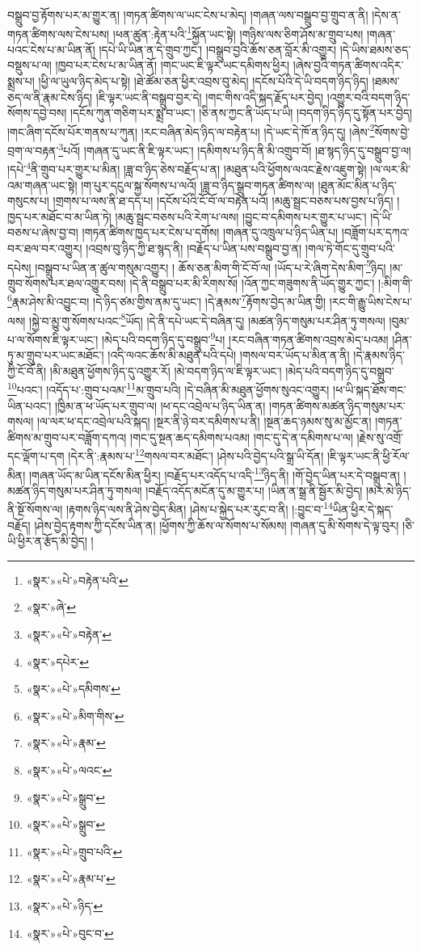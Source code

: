 བསྒྲུབ་བྱ་རྟོགས་པར་མ་གྱུར་ན། །གཏན་ཚིགས་ལ་ཡང་ངེས་པ་མེད། །གཞན་ལས་བསྒྲུབ་བྱ་གྲུབ་ན་ནི། །དེས་ན་གཏན་ཚིགས་ལས་ངེས་པས། །ཕན་ཚུན་:རྟེན་པའི་\footnote{«སྣར་»«པེ་»བརྟེན་པའི་}སྐྱོན་ཡང་སྟེ། །གཉིས་ལས་ཅིག་ཤོས་མ་གྲུབ་པས། །གཞན་པའང་ངེས་པ་མ་ཡིན་ནོ། །དཔེ་ཡི་ཡིན་ན་དེ་གྲུབ་ཀྱང་། །བསྒྲུབ་བྱའི་ཆོས་ཅན་བློར་མི་འགྱུར། །དེ་ཡིས་ཐམས་ཅད་བསྡུས་པ་ལ། །ཁྱབ་པར་ངེས་པ་མ་ཡིན་ནོ། །གང་ཡང་ཇི་ལྟར་ཡང་དམིགས་ཕྱིར། །ཞེས་བྱའི་གཏན་ཚིགས་འདིར་སྨྲས་པ། །ཕྱི་ལ་ཡུལ་ཉིད་མེད་པ་སྟེ། །ཐེ་ཚོམ་ཅན་ཕྱིར་འབྲས་བུ་མེད། །དངོས་པོའི་དེ་ཡི་བདག་ཉིད་ཉིད། །ཐམས་ཅད་ལ་ནི་རྣམ་ངེས་ཉིད། །ཇི་ལྟར་ཡང་ནི་བསྒྲུབ་བྱར་དེ། །གང་གིས་འདི་སྐད་རྗོད་པར་བྱེད། །འགྱུར་བའི་བདག་ཉིད་སོགས་དབྱེ་བས། །དངོས་ཀུན་གཅིག་པར་སྨྲ་བ་ཡང་། །ཅི་ནས་ཀྱང་ནི་ཡོད་པ་ཡི། །བདག་ཉིད་ཉིད་དུ་སྟོན་པར་བྱེད། །གང་ཞིག་དངོས་པོར་གནས་པ་ཀུན། །རང་བཞིན་མེད་ཉིད་ལ་བརྟེན་པ། །དེ་ཡང་དེ་ཁོ་ན་ཉིད་དུ། །ཞེས་\footnote{«སྣར་»ཞེ་}སོགས་བྱེ་བྲག་ལ་བརྟན་\footnote{«སྣར་»«པེ་»བརྟེན་}པའོ། །གཞན་དུ་ཡང་ནི་ཇི་ལྟར་ཡང་། །དམིགས་པ་ཉིད་ནི་མི་འགྲུབ་བོ། །ཐ་སྙད་ཉིད་དུ་བསྒྲུབ་བྱ་ལ། །དཔེ་\footnote{«སྣར་»དཔེར་}ནི་གྲུབ་པར་གྱུར་པ་མིན། །ཟླ་བ་ཉིད་ཅེས་བརྗོད་པ་ན། །མཐུན་པའི་ཕྱོགས་ལའང་རྗེས་འཇུག་སྟེ། །ལ་ལར་མི་འམ་གཞན་ཡང་སྟེ། །ག་པུར་དངུལ་སྐྱ་སོགས་པ་ལའོ། །ཟླ་བ་ཉིད་སྒྲུབ་གཏན་ཚིགས་ལ། །ཐུན་མོང་མིན་པ་ཉིད་གསུངས་པ། །གྲགས་པ་ལས་ནི་ཐ་དད་པ། །དངོས་པོའི་ངོ་བོ་ལ་བརྟེན་པའོ། །མཆུ་སྦྲང་བཅས་པས་བྱས་པ་ཉིད། །ཁྱད་པར་མཐོང་བ་མ་ཡིན་ཏེ། །མཆུ་སྦྲང་བཅས་པའི་རེག་པ་ལས། །བྱུང་བ་དམིགས་པར་གྱུར་པ་ཡང་། །དེ་ཡི་བཅས་པ་ཞེས་བྱ་བ། །གཏན་ཚིགས་ཁྱད་པར་ངེས་པ་དགོས། །གཞན་དུ་འཁྲུལ་པ་ཉིད་ཡིན་པ། །བཟློག་པར་དཀའ་བར་ཐལ་བར་འགྱུར། །འབྲས་བུ་ཉིད་ཀྱི་ཐ་སྙད་ནི། །བརྗོད་པ་ཡིན་པས་བསྒྲུབ་བྱ་ན། །གལ་ཏེ་གོང་དུ་གྲུབ་པའི་དཔེས། །བསྒྲུབ་པ་ཡིན་ན་ཚུལ་གསུམ་འགྱུར། །
ཆོས་ཅན་མིག་གི་ངོ་བོ་ལ། །ཡོད་པ་རེ་ཞིག་དེས་མིག་\footnote{«སྣར་»«པེ་»དམིགས་}ཉིད། །མ་གྲུབ་སོགས་པར་ཐལ་འགྱུར་བས། །དེ་ནི་བསྒྲུབ་པར་མི་རིགས་སོ། །འོན་ཀྱང་གཟུགས་ནི་ཡོད་གྱུར་ཀྱང་། །:མིག་གི་\footnote{«སྣར་»«པེ་»མིག་གིས་}རྣམ་ཤེས་མི་འབྱུང་བ། །དེ་ཉིད་ཙམ་གྱིས་ནམ་དུ་ཡང་། །དེ་རྣམས་\footnote{«སྣར་»«པེ་»རྣམ་}རྟོགས་བྱེད་མ་ཡིན་གྱི། །རང་གི་རྒྱུ་ཡིས་ངེས་པ་ལས། །སྐྱེ་བ་མྱུ་གུ་སོགས་པའང་\footnote{«སྣར་»«པེ་»ལའང་}ཡོད། །དེ་ནི་དཔེ་ཡང་དེ་བཞིན་དུ། །མཚན་ཉིད་གསུམ་པར་ཤིན་ཏུ་གསལ། །བུམ་པ་ལ་སོགས་ཇི་ལྟར་ཡང་། །མེད་པའི་བདག་ཉིད་དུ་བསྒྲུབ་\footnote{«སྣར་»«པེ་»སྒྲུབ་}པ། །རང་བཞིན་གཏན་ཚིགས་འབྲས་མེད་པའམ། །ཤིན་ཏུ་མ་གྲུབ་པར་ཡང་མཐོང་། །འདི་ལའང་ཆོས་མི་མཐུན་པའི་དཔེ། །གསལ་བར་ཡོད་པ་མིན་ན་ནི། །དེ་རྣམས་ཉིད་ཀྱི་ངོ་བོ་ནི། །མི་མཐུན་ཕྱོགས་ཉིད་དུ་འགྱུར་རོ། །མེ་བདག་ཉིད་ལ་ཇི་ལྟར་ཡང་། །མེད་པའི་བདག་ཉིད་དུ་བསྒྲུབ་\footnote{«སྣར་»«པེ་»སྒྲུབ་}པའང་། །འདོད་པ་:གྲུབ་པའམ་\footnote{«སྣར་»«པེ་»གྲུབ་པའི་}མ་གྲུབ་པའི། །དེ་བཞིན་མི་མཐུན་ཕྱོགས་སུའང་འགྱུར། །ཕ་ཡི་སྐད་ཐོས་གང་ཡིན་པའང་། །ཁྱིམ་ན་ཕ་ཡོད་པར་གྲུབ་ལ། །ཕ་དང་འབྲེལ་པ་ཉིད་ཡིན་ན། །གཏན་ཚིགས་མཚན་ཉིད་གསུམ་པར་གསལ། །ལ་ལར་ཕ་དང་འབྲེལ་པའི་སྐད། །སྔར་ནི་ཉེ་བར་དམིགས་པ་ནི། །སྔན་ཆད་ཉམས་སུ་མ་མྱོང་ན། །གཏན་ཚིགས་མ་གྲུབ་པར་བཟློག་དཀའ། །གང་དུ་སྔན་ཆད་དམིགས་པའམ། །གང་དུ་དེ་ན་དམིགས་པ་ལ། །རྗེས་སུ་འགྲོ་དང་ལྡོག་པ་དག །དེར་ནི་:རྣམས་པ་\footnote{«སྣར་»«པེ་»རྣམ་པ་}གསལ་བར་མཐོང་། །ཤེས་པའི་བྱེད་པའི་སྒྲ་ཡི་དོན། །ཇི་ལྟར་ཡང་ནི་ཕྱི་རོལ་མིན། །གཞན་ཡོད་མ་ཡིན་དངོས་མིན་ཕྱིར། །བརྗོད་པར་འདོད་པ་འདི་\footnote{«སྣར་»«པེ་»ཉིད་}ཉིད་ནི། །གོ་བྱེད་ཡིན་པར་དེ་བསྒྲུབ་ན། །མཚན་ཉིད་གསུམ་པར་ཤིན་ཏུ་གསལ། །བརྗོད་འདོད་མངོན་དུ་མ་གྱུར་པ། །ཡིན་ན་སྒྲ་ནི་སྦྱོར་མི་བྱེད། །མར་མེ་ཉིད་ནི་སྔོ་སོགས་ལ། །རྟགས་ཉིད་ལས་ནི་ཤེས་བྱེད་མིན། །ཤེས་པ་སྐྱེད་པར་རུང་བ་ནི། །:བྱུང་བ་\footnote{«སྣར་»«པེ་»བུང་བ་}ཡིན་ཕྱིར་དེ་སྐད་བརྗོད། །ཤེས་བྱེད་རྟགས་ཀྱི་དངོས་ཡིན་ན། །ཕྱོགས་ཀྱི་ཆོས་ལ་སོགས་པ་སོམས། །གཞན་དུ་མི་སོགས་དེ་ལྟ་བུར། །ཅི་ཡི་ཕྱིར་ན་རྩོད་མི་བྱེད། །

